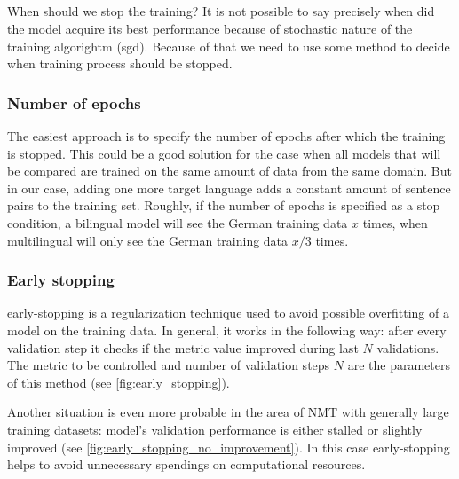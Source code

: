 \subsection{}
\label{section:finishing-the-training}

When should we stop the training?
It is not possible to say precisely when did the model
acquire its best performance because of stochastic nature of
the training algorightm (\acrshort{sgd}).
Because of that we need to use some method to decide when
training process should be stopped.


\subsubsection*{Number of \glspl{epoch}}

The easiest approach is to specify the number of \glspl{epoch}
after which the training is stopped.
This could be a good solution for the case when all models
that will be compared are trained on the same amount of data from
the same domain.
But in our case, adding one more target language adds a constant
amount of sentence pairs to the training set.
Roughly, if the number of \glspl{epoch} is specified as a stop
condition, a bilingual  model will see the German
training data $x$ times, when multilingual 
will only see the German training data $x / 3$ times.

\subsubsection*{Early stopping}

\Gls{early-stopping} is a regularization technique used to avoid
possible \gls{overfitting} of a model on the training data.
In general, it works in the following way: after every validation step
it checks if the metric value improved during last $N$ validations.
The metric to be controlled and number of validation steps $N$ are
the parameters of this method
(see \cref{fig:early_stopping}).

Another situation is even more probable in the area of NMT with generally
large training datasets: model's validation performance
is either stalled or slightly improved
(see \cref{fig:early_stopping_no_improvement}).
In this case \gls{early-stopping} helps to avoid unnecessary spendings
on computational resources.

